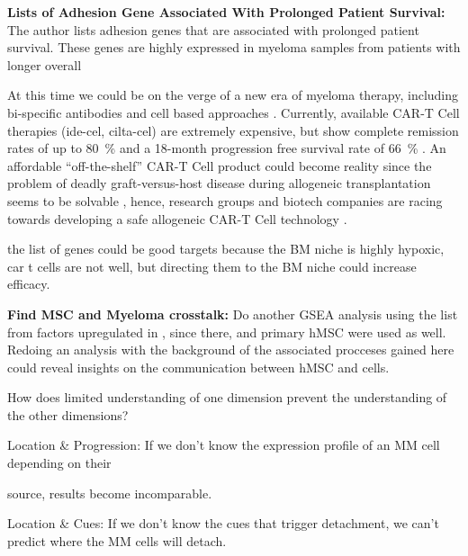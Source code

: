 




\textbf{Lists of Adhesion Gene Associated With Prolonged Patient Survival:}
The author lists adhesion genes that are associated with prolonged patient
survival. These genes are highly expressed in myeloma samples from patients with
longer overall

At this time we could be on the verge of a new era of myeloma therapy,
including bi-specific antibodies and cell based approaches
\cite{moreNovelImmunotherapiesCombinations2023,
    engelhardtFunctionalCureLongterm2024}. Currently, available CAR-T Cell therapies
(ide-cel, cilta-cel) are extremely expensive, but show complete remission rates
of up to \SI{80}{\percent} and a 18-month progression free survival rate of
\SI{66}{\percent} \cite{bobinRecentAdvancesTreatment2022}. An affordable
``off-the-shelf'' CAR-T Cell product could become reality since the problem of
deadly graft-versus-host disease during allogeneic transplantation seems to be
solvable \cite{qasimMolecularRemissionInfant2017}, hence, research groups and
biotech companies are racing towards developing a safe allogeneic CAR-T Cell
technology \cite{depilOfftheshelfAllogeneicCAR2020}.


the list of genes could be good targets because the BM niche is highly hypoxic,
car t cells are not well, but directing them to the BM niche could increase
efficacy.


\textbf{Find MSC and Myeloma crosstalk:}
Do another GSEA analysis using the list from factors upregulated in
\citet{dotterweichContactMyelomaCells2016}, since there, \INA and primary
\ac{hMSC} were used as well. Redoing an analysis with the background of the
associated procceses gained here could reveal insights on the communication
between \ac{hMSC} and \INA cells.



%
\label{sec:discussion_conclusion_cancer}%



How does limited understanding of one dimension prevent the understanding of the
other dimensions?

Location \& Progression: If we don't know the expression profile of an MM cell
depending on their

source, results become incomparable.

Location \& Cues: If we don't know the cues that trigger detachment, we can't
predict where the MM cells will detach.



